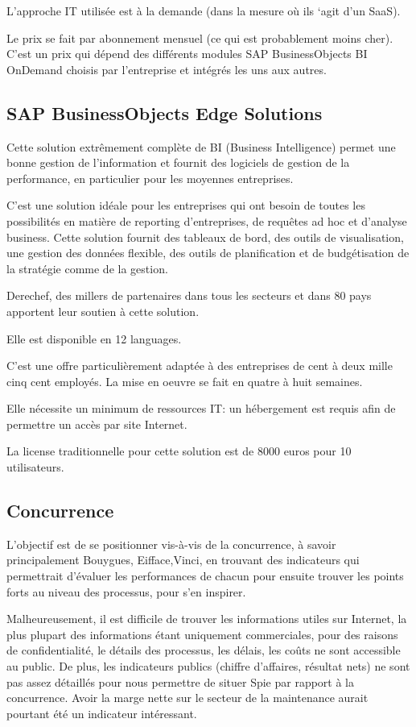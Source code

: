 L’approche IT utilisée est à la demande (dans la mesure où ils ‘agit d’un SaaS).

Le prix se fait par abonnement mensuel (ce qui est probablement moins cher). C’est un prix qui dépend des différents modules SAP BusinessObjects BI OnDemand choisis par l’entreprise et intégrés les uns aux autres.

\subsection{SAP BusinessObjects Edge Solutions}

Cette solution extrêmement complète de BI (Business Intelligence) permet une bonne gestion de l’information et fournit des logiciels de gestion de la performance, en particulier pour les moyennes entreprises.

C’est une solution idéale pour les entreprises qui ont besoin de toutes les possibilités en matière de reporting d’entreprises, de requêtes ad hoc et d’analyse business. Cette solution fournit des tableaux de bord, des outils de visualisation, une gestion des données flexible, des outils de planification et de budgétisation de la stratégie comme de la gestion.

Derechef, des millers de partenaires dans tous les secteurs et dans 80 pays apportent leur soutien à cette solution.

Elle est disponible en 12 languages.

C’est une offre particulièrement adaptée à des entreprises de cent à deux mille cinq cent employés. La mise en oeuvre se fait en quatre à huit semaines.

Elle nécessite un minimum de ressources IT: un hébergement est requis afin de permettre un accès par site Internet.

La license traditionnelle pour cette solution est de 8000 euros pour 10 utilisateurs.

\subsection{Concurrence}

L’objectif est de se positionner vis-à-vis de la concurrence, à savoir principalement Bouygues, Eifface,Vinci, en trouvant des indicateurs qui permettrait d’évaluer les performances de chacun pour ensuite trouver les points forts au niveau des processus, pour s’en inspirer.

Malheureusement, il est difficile de trouver les informations utiles sur Internet, la plus plupart des informations étant uniquement commerciales, pour des raisons de confidentialité, le détails des processus, les délais, les coûts ne sont accessible au public. De plus, les indicateurs publics (chiffre d’affaires, résultat nets) ne sont pas assez détaillés pour nous permettre de situer Spie par rapport à la concurrence. Avoir la marge nette sur le secteur de la maintenance aurait pourtant été un indicateur intéressant.

